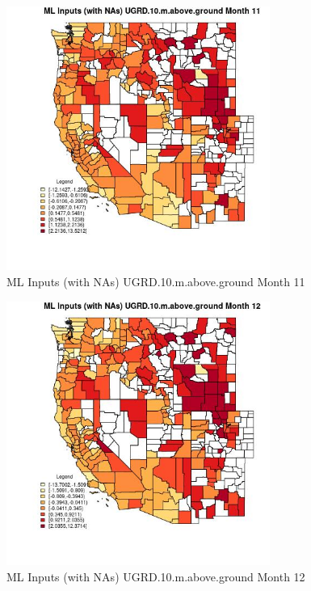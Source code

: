 \clearpage 

\begin{figure} 
\centering  
\includegraphics[width=0.77\textwidth]{Code_Outputs/Report_ML_input_PM25_Step4_part_e_de_duplicated_aves_compiled_2019-05-21wNAs_CountyUGRD10mabovegroundmedianMonth11.jpg} 
\caption{\label{fig:Report_ML_input_PM25_Step4_part_e_de_duplicated_aves_compiled_2019-05-21wNAsCountyUGRD10mabovegroundmedianMonth11}ML Inputs (with NAs) UGRD.10.m.above.ground Month 11} 
\end{figure} 
 

\begin{figure} 
\centering  
\includegraphics[width=0.77\textwidth]{Code_Outputs/Report_ML_input_PM25_Step4_part_e_de_duplicated_aves_compiled_2019-05-21wNAs_CountyUGRD10mabovegroundmedianMonth12.jpg} 
\caption{\label{fig:Report_ML_input_PM25_Step4_part_e_de_duplicated_aves_compiled_2019-05-21wNAsCountyUGRD10mabovegroundmedianMonth12}ML Inputs (with NAs) UGRD.10.m.above.ground Month 12} 
\end{figure} 
 

